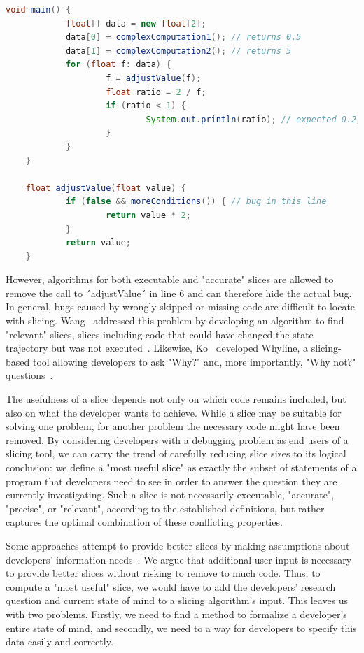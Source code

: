 \begin{lstlisting}[float,caption={Code example for accurate slices.},stepnumber=2,numberfirstline=false,label=lst:sliceAccurate,language=Java]
	void main() {
			float[] data = new float[2];
			data[0] = complexComputation1(); // returns 0.5
			data[1] = complexComputation2(); // returns 5
			for (float f: data) {
					f = adjustValue(f);
					float ratio = 2 / f;
					if (ratio < 1) {
							System.out.println(ratio); // expected 0.2, got 0.4
					}
			}
	}

	float adjustValue(float value) {
			if (false && moreConditions()) { // bug in this line
					return value * 2;
			}
			return value;
	}
\end{lstlisting}

However, algorithms for both executable and "accurate" slices are allowed to remove the call to ´adjustValue´ in line 6 and can therefore hide the actual bug.
In general, bugs caused by wrongly skipped or missing code are difficult to locate with slicing.
Wang \etal\ addressed this problem by developing an algorithm to find "relevant" slices, slices including code that could have changed the state trajectory but was not executed~\cite{wang08:dynamic_slicing_on_java}.
Likewise, Ko \etal\ developed Whyline, a slicing-based tool allowing developers to ask "Why?" and, more importantly, "Why not?" questions~\cite{ko08:debugging_reinvented_asking}.

The usefulness of a slice depends not only on which code remains included, but also on what the developer wants to achieve.
While a slice may be suitable for solving one problem, for another problem the necessary code might have been removed.
By considering developers with a debugging problem as end users of a slicing tool, we can carry the trend of carefully reducing slice sizes to its logical conclusion: we define a "most useful slice" as exactly the subset of statements of a program that developers need to see in order to answer the question they are currently investigating.
Such a slice is not necessarily executable, "accurate", "precise", or "relevant", according to the established definitions, but rather captures the optimal combination of these conflicting properties.

Some approaches attempt to provide better slices by making assumptions about developers' information needs~\cite{sridharan07:thin_slicing}.
We argue that additional user input is necessary to provide better slices without risking to remove to much code.
Thus, to compute a "most useful" slice, we would have to add the developers' research question and current state of mind to a slicing algorithm's input.
This leaves us with two problems.
Firstly, we need to find a method to formalize a developer's entire state of mind, and secondly, we need to a way for developers to specify this data easily and correctly.



